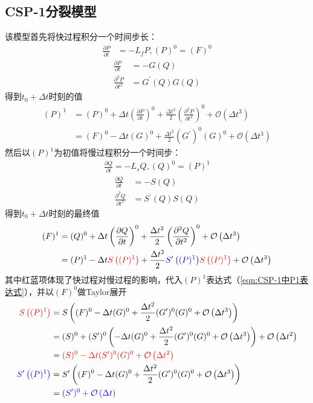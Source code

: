 \documentclass{ctexart}
\begin{document}
\subsection{CSP-1分裂模型}
该模型首先将快过程积分一个时间步长：
\begin{align}
  \frac{\partial P}{\partial t} & = - L_f P, (P)^0 = (F)^0
\end{align}
\begin{align*}
  \frac{\partial P}{\partial t} & = - G(Q) \\
  \frac{\partial^2 P}{\partial t^2} & = G^\prime(Q) G(Q)
\end{align*}
得到$t_0 + \Delta{t}$时刻的值
\begin{align}
  (P)^1 & = (P)^0 + \Delta{t} \left( \frac{\partial P}{\partial t} \right)^0 + \frac{\Delta{t}^2}{2} \left( \frac{\partial^2 P}{\partial t^2} \right)^0 + \mathcal{O} \left( \Delta{t}^3 \right) \nonumber \\
  & = (F)^0 - \Delta{t} (G)^0 + \frac{\Delta{t}^2}{2} (G^\prime)^0 (G)^0 + \mathcal{O} \left( \Delta{t}^3 \right) \label{eqn:CSP-1中P1表达式}
\end{align}
然后以$(P)^1$为初值将慢过程积分一个时间步：
\begin{align}
  \frac{\partial Q}{\partial t} = - L_s Q, (Q)^0 = (P)^1
\end{align}
\begin{align*}
  \frac{\partial Q}{\partial t} & = - S(Q) \\
  \frac{\partial^2 Q}{\partial t^2} & = S^\prime(Q) S(Q)
\end{align*}
得到$t_0 + \Delta{t}$时刻的最终值
\begin{align}
  (F)^1 & = (Q)^0 + \Delta{t} \left( \frac{\partial Q}{\partial t} \right)^0 + \frac{\Delta{t}^2}{2} \left( \frac{\partial^2 Q}{\partial t^2} \right)^0 + \mathcal{O} \left( \Delta{t}^3 \right) \nonumber \\
  & = (P)^1 - \Delta{t} {\color{red}S\left((P)^1\right)} + \frac{\Delta{t}^2}{2} {\color{blue}S^\prime\left((P)^1\right)} {\color{red}S\left((P)^1\right)} + \mathcal{O} \left( \Delta{t}^3 \right)
\end{align}
其中红蓝项体现了快过程对慢过程的影响，代入$(P)^1$表达式（\ref{eqn:CSP-1中P1表达式}），并以$(F)^0$做Taylor展开
\begin{align}
  {\color{red}S\left((P)^1\right)} & = S\left( (F)^0 - \Delta{t} (G)^0 + \frac{\Delta{t}^2}{2} (G^\prime)^0 (G)^0 + \mathcal{O} \left( \Delta{t}^3 \right) \right) \nonumber \\
  & = (S)^0 + (S^\prime)^0 \left( - \Delta{t} (G)^0 + \frac{\Delta{t}^2}{2} (G^\prime)^0 (G)^0 + \mathcal{O} \left( \Delta{t}^3 \right) \right) + \mathcal{O} \left( \Delta{t}^2 \right) \nonumber \\
  & = {\color{red}(S)^0 - \Delta{t} (S^\prime)^0 (G)^0 + \mathcal{O} \left( \Delta{t}^2 \right)} \label{eqn:CSP-1中的SP} \\
  {\color{blue}S^\prime\left((P)^1\right)} & = S^\prime \left( (F)^0 - \Delta{t} (G)^0 + \frac{\Delta{t}^2}{2} (G^\prime)^0 (G)^0 + \mathcal{O} \left( \Delta{t}^3 \right) \right) \nonumber \\
  & = {\color{blue}(S^\prime)^0 + \mathcal{O} \left( \Delta{t} \right)} \label{eqn:CSP-1中的S'P}
\end{align}
\end{document}
